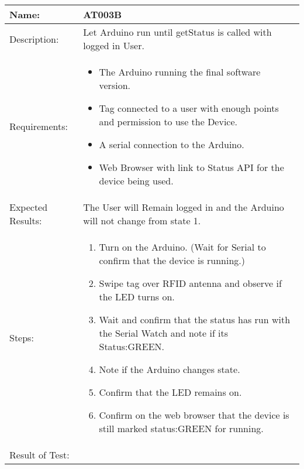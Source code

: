 \begin{table}[h]
	\centering
		\begin{tabular*}{\textwidth}{|l|l|}
		\hline
		\hline
		Name: & AT003B\\
		\hline
		Description: & Let Arduino run until getStatus is called with logged in User.\\
		\hline
		Requirements: & \parbox{0.85\textwidth}{
		\begin{itemize}
			\item The Arduino running the final software version.
			\item Tag connected to a user with enough points and permission to use the Device.
			\item A serial connection to the Arduino.
			\item Web Browser with link to Status API for the device being used.
		\end{itemize}}\\
		\hline
		Expected Results: & \parbox{.85\textwidth}{The User will Remain logged in and the Arduino will not change from state 1.}
		\\
		\hline
		Steps: & \parbox{.85\textwidth}{
		\begin{enumerate}
			\item Turn on the Arduino. (Wait for Serial to confirm that the device is running.)
			\item Swipe tag over RFID antenna and observe if the LED turns on.
			\item Wait and confirm that the status has run with the Serial Watch and note if its Status:GREEN.
			\item Note if the Arduino changes state.
			\item Confirm that the LED remains on.
			\item Confirm on the web browser that the device is still marked status:GREEN for running.
		\end{enumerate}}
		\\
		\hline
		Result of Test: & \\
		\hline
		\end{tabular*}
\end{table}
